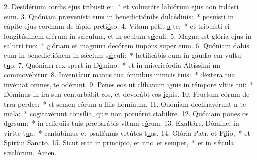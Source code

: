 2. Desidérium cordis ejus tribusti \uline{e}i:~* et voluntáte labiórum ejus non frdásti \uline{e}um.
3. Quóniam prævenísti eum in benedictiónibs dulc\uline{é}dinis:~* posuísti in cápite ejus corónam de lápid preti\uline{ó}so.
4. Vitam pétit \uline{a} te:~* et tribuísti ei longitúdinem diérum in sǽculum, et in sculum s\uline{ǽ}culi.
5. Magna est glória ejus in salutri t\uline{u}o:~* glóriam et magnum decórem impóns super \uline{e}um.
6. Quóniam dabis eum in benedictiónem in sǽclum s\uline{ǽ}culi:~* lætificábis eum in gáudio cm vultu t\uline{u}o.
7. Quóniam rex spert in D\uline{ó}mino:~* et in misericórdia Altíssimi nn commov\uline{é}bitur.
8. Inveniátur manus tua ómnibus inimcis t\uline{u}is:~* déxtera tua invéniat omnes,  te od\uline{é}runt.
9. Pones eos ut clíbanum ignis in témpore vltus t\uline{u}i:~* Dóminus in ira sua conturbábit eos, et devorábt eos \uline{i}gnis.
10. Fructum eórum de trra p\uline{e}rdes:~* et semen eórum a fliis h\uline{ó}minum.
11. Quóniam declinavérunt n te m\uline{a}la:~* cogitavérunt consília, quæ non potuérnt stabil\uline{í}re.
12. Quóniam pones os d\uline{o}rsum:~* in relíquiis tuis præparábis vltum e\uline{ó}rum.
13. Exaltáre, Dómine, in virtte t\uline{u}a:~* cantábimus et psallémus vrtútes t\uline{u}as.
14. Glória Patr, et F\uline{í}lio,~* et Spirtui S\uline{a}ncto.
15. Sicut erat in princípio, et nnc, et s\uline{e}mper,~* et in sǽcula sæclórum. \uline{A}men.
